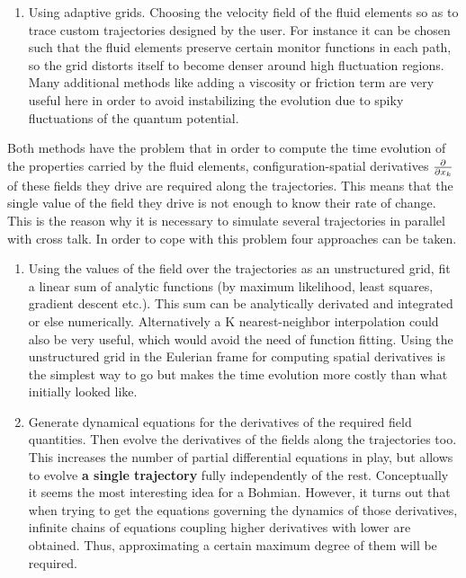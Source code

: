 \documentclass[11pt, a4paper]{article} %
\begin{document}
\begin{enumerate}
\begin{enumerate}
\item Using adaptive grids. Choosing the velocity field of the fluid elements so as to trace custom trajectories designed by the user. For instance it can be chosen such that the fluid elements preserve certain monitor functions in each path, so the grid distorts itself to become denser around high fluctuation regions. Many additional methods like adding a viscosity or friction term are very useful here in order to avoid instabilizing the evolution due to spiky fluctuations of the quantum potential.
\end{enumerate}

Both methods have the problem that in order to compute the time evolution of the properties carried by the fluid elements, configuration-spatial derivatives $\pdv{}{x_k}$ of these fields they drive are required along the trajectories. This means that the single value of the field they drive is not enough to know their rate of change. This is the reason why it is necessary to simulate several trajectories in parallel with cross talk. In order to cope with this problem four approaches can be taken.

\begin{enumerate}
\item Using the values of the field over the trajectories as an unstructured grid, fit a linear sum of analytic functions (by maximum likelihood, least squares, gradient descent etc.). This sum can be analytically derivated and integrated or else numerically. Alternatively a K nearest-neighbor interpolation could also be very useful, which would avoid the need of function fitting. Using the unstructured grid in the Eulerian frame for computing spatial derivatives is the simplest way to go but makes the time evolution more costly than what initially looked like.

\item Generate dynamical equations for the derivatives of the required field quantities. Then evolve the derivatives of the fields along the trajectories too. This increases the number of partial differential equations in play, but allows to evolve {\bf a single trajectory} fully independently of the rest. Conceptually it seems the most interesting idea for a Bohmian. However, it turns out that when trying to get the equations governing the dynamics of those derivatives, infinite chains of equations coupling higher derivatives with lower are obtained. Thus, approximating a certain maximum degree of them will be required.


\end{enumerate}
\end{enumerate}
\end{document}
